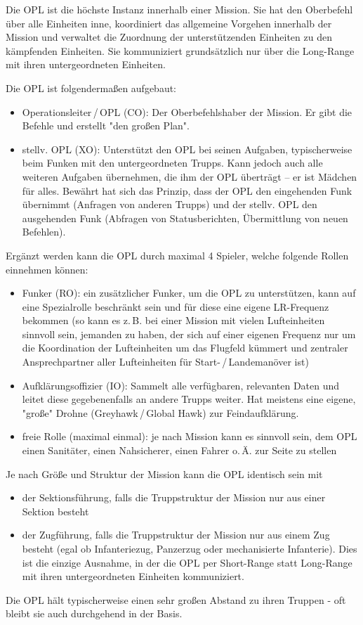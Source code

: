 Die \ac{OPL} ist die höchste Instanz innerhalb einer Mission. Sie hat den Oberbefehl über alle Einheiten inne, koordiniert das allgemeine Vorgehen innerhalb der Mission und verwaltet die Zuordnung der unterstützenden Einheiten zu den kämpfenden Einheiten. Sie kommuniziert grundsätzlich nur über die Long-Range mit ihren untergeordneten Einheiten.
\par\bigskip
Die \ac{OPL} ist folgendermaßen aufgebaut:
\begin{itemize}
	\item Operationsleiter\,/\,\acs{OPL} (\acf{CO}): Der Oberbefehlshaber der Mission. Er gibt die Befehle und erstellt "den großen Plan".
	\item stellv. \ac{OPL} (\acf{XO}): Unterstützt den \ac{OPL} bei seinen Aufgaben, typischerweise beim Funken mit den untergeordneten Trupps. Kann jedoch auch alle weiteren Aufgaben übernehmen, die ihm der \ac{OPL} überträgt -- er ist Mädchen für alles. Bewährt hat sich das Prinzip, dass der \ac{OPL} den eingehenden Funk übernimmt (Anfragen von anderen Trupps) und der stellv. \ac{OPL} den ausgehenden Funk (Abfragen von Statusberichten, Übermittlung von neuen Befehlen).
\end{itemize}
Ergänzt werden kann die \ac{OPL} durch maximal 4 Spieler, welche folgende Rollen einnehmen können:
\begin{itemize}
	\item Funker (\acf{RO}): ein zusätzlicher Funker, um die \ac{OPL} zu unterstützen, kann auf eine Spezialrolle beschränkt sein und für diese eine eigene LR-Frequenz bekommen (so kann es z.\,B. bei einer Mission mit vielen Lufteinheiten sinnvoll sein, jemanden zu haben, der sich auf einer eigenen Frequenz nur um die Koordination der Lufteinheiten um das Flugfeld kümmert und zentraler Ansprechpartner aller Lufteinheiten für Start-\,/\,Landemanöver ist)
	\item Aufklärungsoffizier (\acf{IO}): Sammelt alle verfügbaren, relevanten Daten und leitet diese gegebenenfalls an andere Trupps weiter. Hat meistens eine eigene, "große" Drohne (Greyhawk\,/\,Global Hawk) zur Feindaufklärung.
	\item freie Rolle (maximal einmal): je nach Mission kann es sinnvoll sein, dem \ac{OPL} einen Sanitäter, einen Nahsicherer, einen Fahrer o.\,Ä. zur Seite zu stellen
\end{itemize}
Je nach Größe und Struktur der Mission kann die \ac{OPL} identisch sein mit
\begin{itemize}
	\item der Sektionsführung, falls die Truppstruktur der Mission nur aus einer Sektion besteht
	\item der Zugführung, falls die Truppstruktur der Mission nur aus einem Zug besteht (egal ob Infanteriezug, Panzerzug oder mechanisierte Infanterie). Dies ist die einzige Ausnahme, in der die \ac{OPL} per Short-Range statt Long-Range mit ihren untergeordneten Einheiten kommuniziert.
\end{itemize}
Die OPL hält typischerweise einen sehr großen Abstand zu ihren Truppen - oft bleibt sie auch durchgehend in der Basis.
